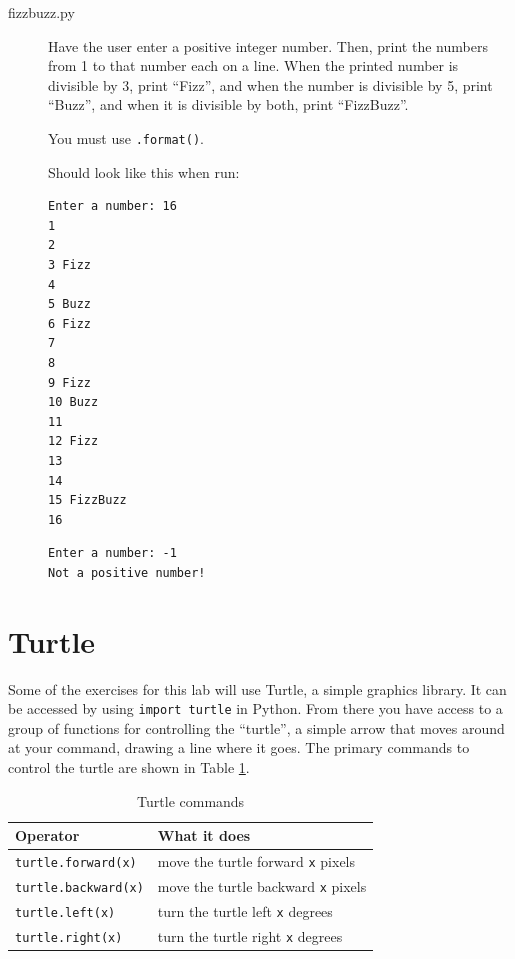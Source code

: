 \documentclass[11pt]{cselabheader}
\begin{document}
\begin{description}
  \item[fizzbuzz.py] Have the user enter a positive integer number. Then, print
    the numbers from 1 to that number each on a line. When the printed number is
    divisible by 3, print ``Fizz'', and when the number is divisible by 5, print
    ``Buzz'', and when it is divisible by both, print ``FizzBuzz''.

    You must use \lstinline!.format()!.

    Should look like this when run:
    \begin{lstlisting}[style=bash]
Enter a number: 16
1
2
3 Fizz
4
5 Buzz
6 Fizz
7
8
9 Fizz
10 Buzz
11
12 Fizz
13
14
15 FizzBuzz
16
    \end{lstlisting}
    \begin{lstlisting}[style=bash]
Enter a number: -1
Not a positive number!
    \end{lstlisting}

\end{description}

\pagebreak
\section{Turtle}

Some of the exercises for this lab will use Turtle, a simple graphics library.
It can be accessed by using \lstinline{import turtle} in Python. From there you
have access to a group of functions for controlling the ``turtle'', a simple
arrow that moves around at your command, drawing a line where it goes. The
primary commands to control the turtle are shown in Table \ref{tab:turtle}.

\begin{table}[h]
  \centering
  \begin{tabular}{ll}
    \toprule
    Operator & What it does\\
    \midrule
    \lstinline!turtle.forward(x)! & move the turtle forward \lstinline!x! pixels \\
    \lstinline!turtle.backward(x)! & move the turtle backward \lstinline!x! pixels \\
    \lstinline!turtle.left(x)! & turn the turtle left \lstinline!x! degrees \\
    \lstinline!turtle.right(x)! & turn the turtle right \lstinline!x! degrees \\
    \bottomrule
  \end{tabular}
  \caption{Turtle commands}
  \label{tab:turtle}
\end{table}
\end{document}
